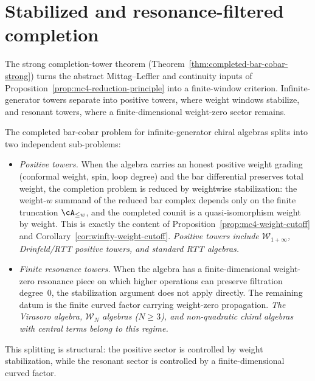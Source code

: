 \section{Stabilized and resonance-filtered completion}
\label{sec:mc4-splitting}

The strong completion-tower theorem
(Theorem~\ref{thm:completed-bar-cobar-strong}) turns the abstract
Mittag--Leffler and continuity inputs of
Proposition~\ref{prop:mc4-reduction-principle} into a finite-window
criterion.  Infinite-generator towers separate into positive towers,
where weight windows stabilize, and resonant towers, where a
finite-dimensional weight-zero sector remains.

\begin{remark}
\label{rem:mc4-splitting}
The completed bar-cobar problem for infinite-generator chiral
algebras splits into two independent sub-problems:
\begin{itemize}
\item \emph{Positive towers.}
 When the algebra carries an honest positive weight grading
 (conformal weight, spin, loop degree) and the bar differential
 preserves total weight, the completion problem is reduced by
 weightwise stabilization:
 the weight-$w$ summand of the reduced bar complex depends only on
 the finite truncation $\cA_{\le w}$, and the completed
 counit is a quasi-isomorphism weight by weight.
 This is exactly the content of
 Proposition~\ref{prop:mc4-weight-cutoff} and
 Corollary~\ref{cor:winfty-weight-cutoff}.
 \emph{Positive towers include $\mathcal{W}_{1+\infty}$,
 Drinfeld/RTT positive towers, and standard RTT algebras.}
\item \emph{Finite resonance towers.}
 When the algebra has a finite-dimensional weight-zero
 resonance piece on which higher operations can preserve
 filtration degree~$0$, the stabilization argument does not
 apply directly.  The remaining datum is the finite curved factor
 carrying weight-zero propagation.
 \emph{The Virasoro algebra, $\mathcal{W}_N$ algebras
 ($N \ge 3$), and non-quadratic chiral algebras with central
 terms belong to this regime.}
\end{itemize}
This splitting is structural: the positive sector is controlled by
weight stabilization, while the resonant sector is controlled by a
finite-dimensional curved factor.
\end{remark}

